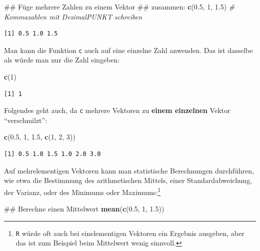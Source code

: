 \documentclass[12pt,]{tufte-book}
\newenvironment{Shaded}{\begin{snugshade}}{\end{snugshade}}
\newcommand{\KeywordTok}[1]{\textcolor[rgb]{0.13,0.29,0.53}{\textbf{#1}}}
\newcommand{\DecValTok}[1]{\textcolor[rgb]{0.00,0.00,0.81}{#1}}
\newcommand{\FloatTok}[1]{\textcolor[rgb]{0.00,0.00,0.81}{#1}}
\newcommand{\CommentTok}[1]{\textcolor[rgb]{0.56,0.35,0.01}{\textit{#1}}}
\newcommand{\NormalTok}[1]{#1}
\theoremstyle{definition}
\theoremstyle{definition}
\theoremstyle{definition}
\theoremstyle{remark}
\begin{document}
\begin{Shaded}
\begin{Highlighting}[]
\NormalTok{## Füge mehrere Zahlen zu einem Vektor}
\NormalTok{## zusammen:}
\KeywordTok{c}\NormalTok{(}\FloatTok{0.5}\NormalTok{, }\DecValTok{1}\NormalTok{, }\FloatTok{1.5}\NormalTok{)  }\CommentTok{# Kommazahlen mit DezimalPUNKT schreiben}
\end{Highlighting}
\end{Shaded}

\begin{verbatim}
[1] 0.5 1.0 1.5
\end{verbatim}

Man kann die Funktion \texttt{c} auch auf eine einzelne Zahl anwenden.
Das ist dasselbe als würde man nur die Zahl eingeben:

\begin{Shaded}
\begin{Highlighting}[]
\KeywordTok{c}\NormalTok{(}\DecValTok{1}\NormalTok{)}
\end{Highlighting}
\end{Shaded}

\begin{verbatim}
[1] 1
\end{verbatim}

Folgendes geht auch, da \texttt{c} mehrere Vektoren zu \textbf{einem
einzelnen} Vektor ``verschmilzt'':

\begin{Shaded}
\begin{Highlighting}[]
\KeywordTok{c}\NormalTok{(}\FloatTok{0.5}\NormalTok{, }\DecValTok{1}\NormalTok{, }\FloatTok{1.5}\NormalTok{, }\KeywordTok{c}\NormalTok{(}\DecValTok{1}\NormalTok{, }\DecValTok{2}\NormalTok{, }\DecValTok{3}\NormalTok{))}
\end{Highlighting}
\end{Shaded}

\begin{verbatim}
[1] 0.5 1.0 1.5 1.0 2.0 3.0
\end{verbatim}

Auf mehrelementigen Vektoren kann man statistische Berechnungen
durchführen, wie etwa die Bestimmung des arithmetischen Mittels, einer
Standardabweichung, der Varianz, oder des Minimums oder
Maximums:\footnote{\texttt{R} würde oft auch bei einelementigen Vektoren
  ein Ergebnis ausgeben, aber das ist zum Beispiel beim Mittelwert wenig
  sinnvoll.}

\begin{Shaded}
\begin{Highlighting}[]
\NormalTok{## Berechne einen Mittelwert}
\KeywordTok{mean}\NormalTok{(}\KeywordTok{c}\NormalTok{(}\FloatTok{0.5}\NormalTok{, }\DecValTok{1}\NormalTok{, }\FloatTok{1.5}\NormalTok{))}
\end{Highlighting}
\end{Shaded}
\end{document}
